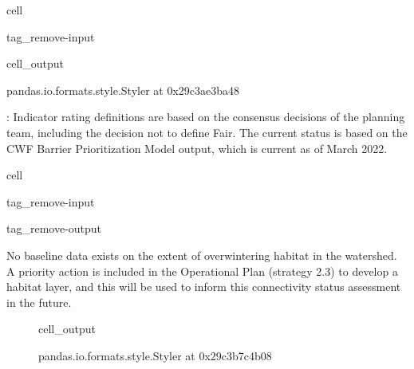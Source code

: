 \documentclass[letterpaper,10pt,english]{jupyterBook}
\begin{document}
\begin{sphinxuseclass}{cell}
\begin{sphinxuseclass}{tag_remove-input}\begin{sphinxVerbatimOutput}

\begin{sphinxuseclass}{cell_output}
\begin{sphinxVerbatim}[commandchars=\\\{\}]
\PYGZlt{}pandas.io.formats.style.Styler at 0x29c3ae3ba48\PYGZgt{}
\end{sphinxVerbatim}

\end{sphinxuseclass}\end{sphinxVerbatimOutput}

\end{sphinxuseclass}
\end{sphinxuseclass}
\sphinxAtStartPar
{}: Indicator rating definitions are based on the consensus decisions of the planning team, including the decision not to define Fair. The current status is based on the CWF Barrier Prioritization Model output, which is current as of March 2022.

\begin{sphinxuseclass}{cell}
\begin{sphinxuseclass}{tag_remove-input}
\begin{sphinxuseclass}{tag_remove-output}
\end{sphinxuseclass}
\end{sphinxuseclass}
\end{sphinxuseclass}
\sphinxAtStartPar
{} No baseline data exists on the extent of overwintering habitat in the watershed. A priority action is included in the Operational Plan (strategy 2.3) to develop a habitat layer, and this will be used to inform this connectivity status assessment in the future.

\begin{figure}[htbp]
\centering
\capstart
\begin{sphinxVerbatimOutput}

\begin{sphinxuseclass}{cell_output}
\begin{sphinxVerbatim}[commandchars=\\\{\}]
\PYGZlt{}pandas.io.formats.style.Styler at 0x29c3b7c4b08\PYGZgt{}
\end{sphinxVerbatim}

\end{sphinxuseclass}\end{sphinxVerbatimOutput}
\caption{}\label{\detokenize{EcoAttributes:table7}}\end{figure}
\end{document}
